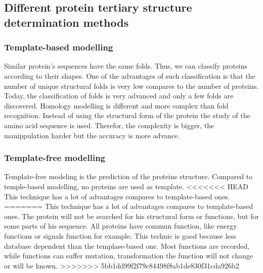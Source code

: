 \subsection{Different protein tertiary structure determination methods} 
\subsubsection{Template-based modelling}
Similar protein's sequences have the same folds. Thus, we can classify proteins according to their shapes. One of the advantages of such classification is that the number of unique structural folds is very low compares to the number of proteins.
\newline
Today, the classification of folds is very advanced and only a few folds are discovered.
Homology modelling is different and more complex than fold recognition. Instead of using the structural form of the protein the study of the amino acid sequence is used. Therefor, the complexity is bigger, the manippulation harder but the accuracy is more advance.

\subsubsection{Template-free modelling}
Template-free modeling is the prediction of the proteins structure. Compared to temple-based modelling, no proteins are used as template. 
<<<<<<< HEAD
\newline This technique has a lot of advantages compares to template-based ones.
=======
\newline This technique has a lot of advantages compares to template-based ones. The protein will not be searched for his structural form or functions, but for some parts of his sequence. All proteins have commun function,  like energy functions or signals function for example. This technic is good because less database dependent than the templase-based one. Most functions are recorded, while functions can suffer mutation, transformation the function will not change or will be known.
>>>>>>> 5bb1dd99f2f79c84498f8ab1de830f31cda926b2
